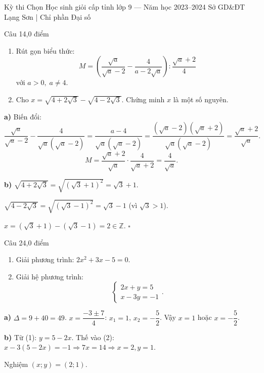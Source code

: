 ﻿%
%
  {Kỳ thi Chọn Học sinh giỏi cấp tỉnh lớp 9 — Năm học 2023--2024}%
  {Sở GD\&ĐT Lạng Sơn | Chỉ phần Đại số}

\begin{de_cau}{Câu 1}{4,0 điểm}
\begin{enumerate}[label=\alph*)]
  \item Rút gọn biểu thức:
  \[M = \left(\dfrac{\sqrt{a}}{\sqrt{a}-2} - \dfrac{4}{a-2\sqrt{a}}\right) : \dfrac{\sqrt{a}+2}{4}\]
  với $a > 0,\; a \neq 4$.
  \item Cho $x = \sqrt{4+2\sqrt{3}} - \sqrt{4-2\sqrt{3}}$. Chứng minh $x$ là một số nguyên.
\end{enumerate}
\end{de_cau}

\begin{loi_giai_cau}
\textbf{a)} Biến đổi:
\[\frac{\sqrt{a}}{\sqrt{a}-2} - \frac{4}{\sqrt{a}(\sqrt{a}-2)} = \frac{a-4}{\sqrt{a}(\sqrt{a}-2)} = \frac{(\sqrt{a}-2)(\sqrt{a}+2)}{\sqrt{a}(\sqrt{a}-2)} = \frac{\sqrt{a}+2}{\sqrt{a}}.\]
\[M = \frac{\sqrt{a}+2}{\sqrt{a}} \cdot \frac{4}{\sqrt{a}+2} = \boxed{\dfrac{4}{\sqrt{a}}}.\]

\textbf{b)} $\sqrt{4+2\sqrt{3}} = \sqrt{(\sqrt{3}+1)^2} = \sqrt{3}+1$.

$\sqrt{4-2\sqrt{3}} = \sqrt{(\sqrt{3}-1)^2} = \sqrt{3}-1$ (vì $\sqrt{3}>1$).

$x = (\sqrt{3}+1) - (\sqrt{3}-1) = 2 \in \mathbb{Z}$. $\square$
\end{loi_giai_cau}

\begin{de_cau}{Câu 2}{4,0 điểm}
\begin{enumerate}[label=\alph*)]
  \item Giải phương trình: $2x^2 + 3x - 5 = 0$.
  \item Giải hệ phương trình:
  \[\begin{cases} 2x + y = 5 \\ x - 3y = -1 \end{cases}.\]
\end{enumerate}
\end{de_cau}

\begin{loi_giai_cau}
\textbf{a)} $\Delta = 9 + 40 = 49$. $x = \dfrac{-3 \pm 7}{4}$: $x_1 = 1$, $x_2 = -\dfrac{5}{2}$. Vậy $\boxed{x=1}$ hoặc $\boxed{x=-\dfrac{5}{2}}$.

\textbf{b)} Từ (1): $y = 5-2x$. Thế vào (2): $x - 3(5-2x) = -1 \Rightarrow 7x = 14 \Rightarrow x=2, y=1$.

Nghiệm $\boxed{(x;y) = (2;1)}$.
\end{loi_giai_cau}

